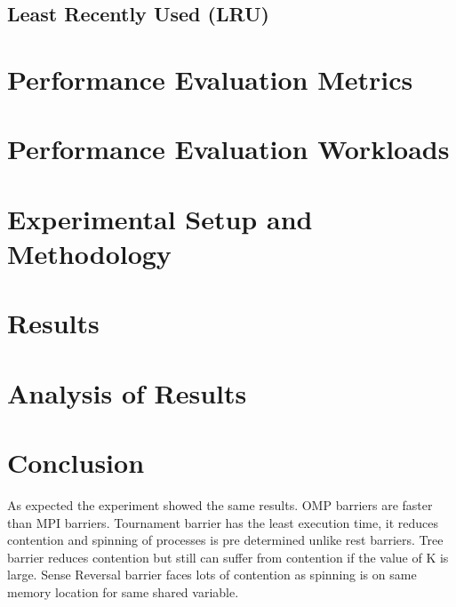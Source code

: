 \documentclass[11pt,pdftex,twocolumn]{article}
\begin{document}
\subsection{Least Recently Used (LRU)}
\lipsum

\section{Performance Evaluation Metrics}
\lipsum

\section{Performance Evaluation Workloads}
\lipsum

\section{Experimental Setup and Methodology}
\lipsum

\section{Results}
\lipsum

\section{Analysis of Results}
\lipsum

\section{Conclusion}
As expected the experiment showed the same results. OMP barriers are faster than MPI barriers. Tournament barrier has the least execution time, it reduces contention and spinning of processes is pre determined unlike rest barriers. Tree barrier reduces contention but still can suffer from contention if the value of K is large. Sense Reversal barrier faces lots of contention as spinning is on same memory location for same shared variable.
\end{document}
